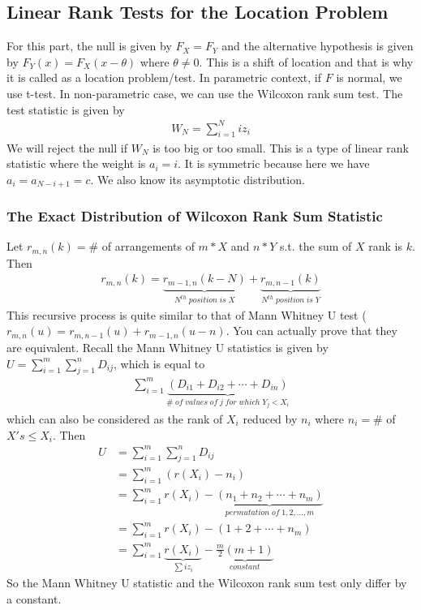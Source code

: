 \documentclass[twoside]{article}
\begin{document}
	\subsection{Linear Rank Tests for the Location Problem}
	For this part, the null is given by $F_X=F_Y$ and the alternative hypothesis is given by $F_Y(x) = F_X(x - \theta)$ where $\theta \neq 0$. This is a shift of location and that is why it is called as a location problem/test. In parametric context, if $F$ is normal, we use t-test. In non-parametric case, we can use the Wilcoxon rank sum test. The test statistic is given by
	\begin{align*}
		W_N = \sum_{i=1}^{N} i z_i
	\end{align*}
	We will reject the null if $W_N$ is too big or too small. This is a type of linear rank statistic where the weight is $a_i = i$. It is symmetric because here we have $a_i = a_{N-i+1} = c$. We also know its asymptotic distribution. 
	\subsubsection{The Exact Distribution of Wilcoxon Rank Sum Statistic}
	Let $r_{m,n}(k) = \#$ of arrangements of $m*X$ and $n*Y$ s.t. the sum of $X$ rank is $k$. Then
	\begin{align*}
		r_{m,n}(k) = \underbrace{r_{m-1, n}(k-N)}_{N^{th} \; position \; is \; X} + \underbrace{r_{m,n-1}(k)}_{N^{th} \; position \; is \; Y} 
	\end{align*}
	This recursive process is quite similar to that of Mann Whitney U test ($r_{m,n}(u) = r_{m,n-1}(u) + r_{m-1, n}(u-n)$. You can actually prove that they are equivalent. Recall the Mann Whitney U statistics is given by $U = \sum_{i=1}^{m} \sum_{j=1}^{n} D_{ij}$, which is equal to 
	\begin{align*}
		\sum_{i=1}^{m} \underbrace{\left( D_{i1} + D_{i2} + \cdots + D_{in} \right)}_{\# \; of \; values \; of \; j \; for \; which \; Y_j<X_i}
	\end{align*}
	which can also be considered as the rank of $X_i$ reduced by $n_i$ where $n_i = \#$ of $X's \leqslant X_i$.  Then
	\begin{align*}
		U &= \sum_{i=1}^{m} \sum_{j=1}^{n} D_{ij} \\
		&= \sum_{i=1}^{m} \left( r(X_i) - n_i \right) \\
		&= \sum_{i=1}^{m} r \left( X_i \right) - \underbrace{\left( n_1 + n_2 + \cdots + n_m \right)}_{permutation \; of \; 1,2,...,m} \\
		&= \sum_{i=1}^{m} r \left( X_i \right) - \left( 1 + 2 + \cdots + n_m \right) \\
		&= \sum_{i=1}^{m} \underbrace{r \left(X_i \right)}_{\sum i z_i} - \underbrace{\frac{m}{2}(m+1)}_{constant}
	\end{align*}
	So the Mann Whitney U statistic and the Wilcoxon rank sum test only differ by a constant. 
\end{document}
